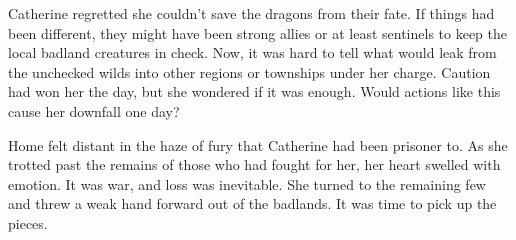 \begin{multicols*}{2}
Catherine regretted she couldn't save the dragons from their fate.
If things had been different, they might have been strong allies or at least sentinels to keep the local badland creatures in check.
Now, it was hard to tell what would leak from the unchecked wilds into other regions or townships under her charge.
Caution had won her the day, but she wondered if it was enough.
Would actions like this cause her downfall one day?

Home felt distant in the haze of fury that Catherine had been prisoner to.
As she trotted past the remains of those who had fought for her, her heart swelled with emotion.
It was war, and loss was inevitable.
She turned to the remaining few and threw a weak hand forward out of the badlands.
It was time to pick up the pieces.

\end{multicols*}

